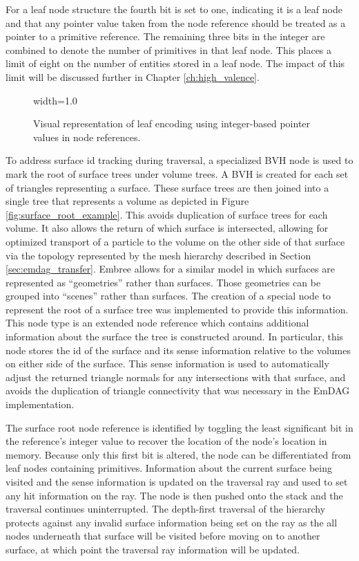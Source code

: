 For a leaf node structure the fourth bit is set to one, indicating it is a leaf
node and that any pointer value taken from the node reference should be treated
as a pointer to a primitive reference. The remaining three bits in the integer
are combined to denote the number of primitives in that leaf node. This places a
limit of eight on the number of entities stored in a leaf node. The impact of
this limit will be discussed further in Chapter \ref{ch:high_valence}.

\begin{figure}[H]
  \centering
  {width=1.0\textwidth}
  \caption[Graphic of leaf node encoding.]{Visual representation of leaf
    encoding using integer-based pointer values in node references.}
  \label{fig:leaf_encoding}
\end{figure}

To address surface id tracking during traversal, a specialized BVH node is used
to mark the root of surface trees under volume trees. A BVH is created for each
set of triangles representing a surface. These surface trees are then joined
into a single tree that represents a volume as depicted in Figure
\ref{fig:surface_root_example}. This avoids duplication of surface trees for
each volume. It also allows the return of which surface is intersected, allowing
for optimized transport of a particle to the volume on the other side of that
surface via the topology represented by the mesh hierarchy described in Section
\ref{sec:emdag_transfer}. Embree allows for a similar model in which surfaces
are represented as ``geometries'' rather than surfaces. Those geometries can be
grouped into ``scenes'' rather than surfaces.  The creation of a special node to
represent the root of a surface tree was implemented to provide this
information. This node type is an extended node reference which contains
additional information about the surface the tree is constructed around. In
particular, this node stores the id of the surface and its sense information
relative to the volumes on either side of the surface. This sense information is
used to automatically adjust the returned triangle normals for any intersections
with that surface, and avoids the duplication of triangle connectivity that was
necessary in the EmDAG implementation.

The surface root node reference is identified by toggling the least significant
bit in the reference's integer value to recover the location of the node's
location in memory. Because only this first bit is altered, the node can be
differentiated from leaf nodes containing primitives. Information about the
current surface being visited and the sense information is updated on the
traversal ray and used to set any hit information on the ray. The node is then
pushed onto the stack and the traversal continues uninterrupted. The depth-first
traversal of the hierarchy protects against any invalid surface information
being set on the ray as the all nodes underneath that surface will be visited
before moving on to another surface, at which point the traversal ray
information will be updated.

